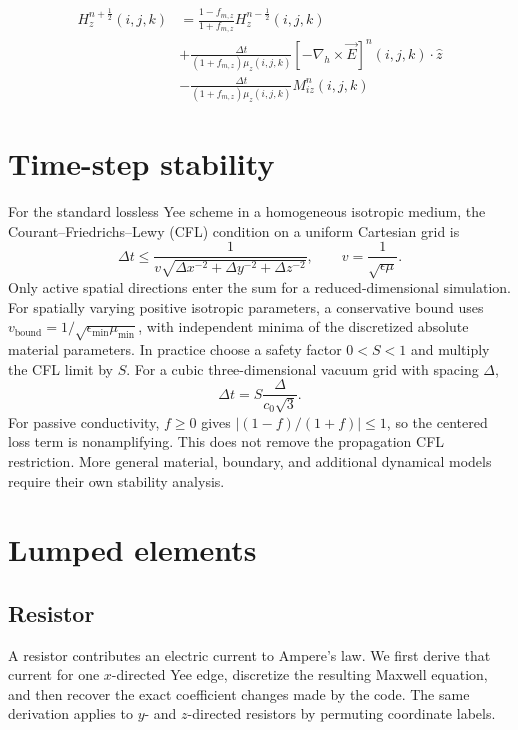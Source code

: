 \documentclass[10pt]{article}
\begin{document}
\begin{equation}
	\boxed{
		\begin{aligned}
			H^{n+\frac{1}{2}}_{z}(i,j,k) & = \frac{1-f_{m,z}}{1+f_{m,z}}  H^{n-\frac{1}{2}}_{z}(i,j,k)                                                    \\
			                             & + \frac{\Delta t}{(1+f_{m,z})\mu_{z}(i,j,k)} \left[ -\nabla_h\times \vec{E} \right]^{n}(i,j,k) \cdot \hat{z} \\
			                             & - \frac{\Delta t}{(1+f_{m,z})\mu_{z}(i,j,k)} M^{n}_{iz}(i,j,k)
		\end{aligned}
	}
\end{equation}

\section{Time-step stability}
For the standard lossless Yee scheme in a homogeneous isotropic medium,
the Courant--Friedrichs--Lewy (CFL) condition on a uniform Cartesian grid is
\begin{equation}
    \Delta t\leq\frac{1}{v\sqrt{\Delta x^{-2}+\Delta y^{-2}+\Delta z^{-2}}},
    \qquad v=\frac{1}{\sqrt{\epsilon\mu}}.
\end{equation}
Only active spatial directions enter the sum for a reduced-dimensional
simulation. For spatially varying positive isotropic parameters, a
conservative bound uses $v_{\mathrm{bound}}=1/\sqrt{\epsilon_{\min}\mu_{\min}}$,
with independent minima of the discretized absolute material parameters.
In practice choose a safety factor $0<S<1$ and multiply the CFL limit by $S$.
For a cubic three-dimensional vacuum grid with spacing $\Delta$,
\begin{equation}
    \Delta t=S\frac{\Delta}{c_0\sqrt{3}}.
\end{equation}
For passive conductivity, $f\geq0$ gives
$\lvert(1-f)/(1+f)\rvert\leq1$, so the centered loss term is nonamplifying.
This does not remove the propagation CFL restriction. More general material,
boundary, and additional dynamical models require their own stability analysis.

\section{Lumped elements}
\label{sec:lumped}
\subsection{Resistor}
A resistor contributes an electric current to Ampere's law. We first derive
that current for one $x$-directed Yee edge, discretize the resulting Maxwell
equation, and then recover the exact coefficient changes made by the code.
The same derivation applies to $y$- and $z$-directed resistors by permuting
coordinate labels.
\end{document}
